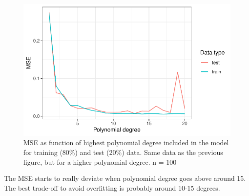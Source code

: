 \documentclass[
  letterpaper,
  DIV=11,
  numbers=noendperiod]{scrartcl}
\newenvironment{Shaded}{\begin{snugshade}}{\end{snugshade}}
\newcommand{\AttributeTok}[1]{\textcolor[rgb]{0.40,0.45,0.13}{#1}}
\newcommand{\CommentTok}[1]{\textcolor[rgb]{0.37,0.37,0.37}{#1}}
\newcommand{\FunctionTok}[1]{\textcolor[rgb]{0.28,0.35,0.67}{#1}}
\newcommand{\NormalTok}[1]{\textcolor[rgb]{0.00,0.23,0.31}{#1}}
\newcommand{\OtherTok}[1]{\textcolor[rgb]{0.00,0.23,0.31}{#1}}
\newcommand{\SpecialCharTok}[1]{\textcolor[rgb]{0.37,0.37,0.37}{#1}}
\newcommand{\StringTok}[1]{\textcolor[rgb]{0.13,0.47,0.30}{#1}}
\begin{document}
\begin{Shaded}
\end{Shaded}

\begin{figure}[H]

{\centering \includegraphics{w35-exercises_files/figure-pdf/unnamed-chunk-17-1.pdf}

}

\caption{MSE as function of highest polynomial degree included in the
model for training (80\%) and test (20\%) data. Same data as the
previous figure, but for a higher polynomial degree. n = 100}

\end{figure}

The MSE starts to really deviate when polynomial degree goes above
around 15. The best trade-off to avoid overfitting is probably around
10-15 degrees.
\end{document}
